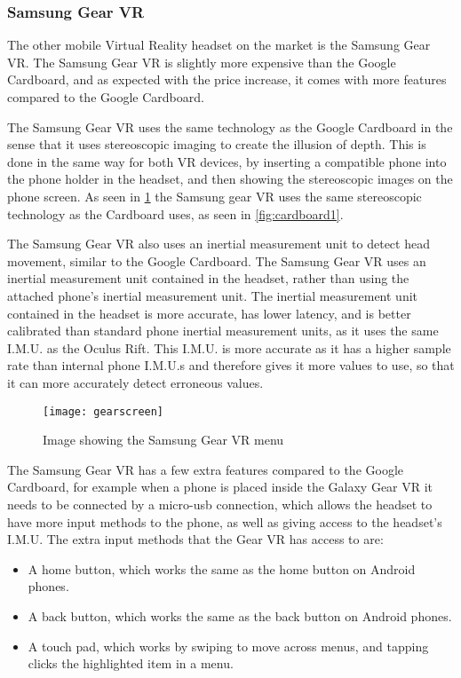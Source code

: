 \subsubsection{Samsung Gear VR}
The other mobile Virtual Reality headset on the market is the Samsung Gear VR. The Samsung Gear VR is slightly more expensive than the Google Cardboard, and as expected with the price increase, it comes with more features compared to the Google Cardboard.
\newline
\par
The Samsung Gear VR uses the same technology as the Google Cardboard in the sense that it uses stereoscopic imaging to create the illusion of depth. This is done in the same way for both VR devices, by inserting a compatible phone into the phone holder in the headset, and then showing the stereoscopic images on the phone screen. As seen in \ref{fig:gearscreen} the Samsung gear VR uses the same stereoscopic technology as the Cardboard uses, as seen in \ref{fig:cardboard1}.
\newline
\par
The Samsung Gear VR also uses an inertial measurement unit to detect head movement, similar to the Google Cardboard. The Samsung Gear VR uses an inertial measurement unit contained in the headset, rather than using the attached phone's inertial measurement unit. The inertial measurement unit contained in the headset is more accurate, has lower latency, and is better calibrated than standard phone inertial measurement units, as it uses the same I.M.U. as the Oculus Rift. This I.M.U. is more accurate as it has a higher sample rate than internal phone I.M.U.s and therefore gives it more values to use, so that it can more accurately detect erroneous values.

\begin{figure}[H]
	\texttt{[image: gearscreen]}
	\centering
	\caption{Image showing the Samsung Gear VR menu \cite{gearmenu}}
	\label{fig:gearscreen}
\end{figure}

The Samsung Gear VR has a few extra features compared to the Google Cardboard, for example when a phone is placed inside the Galaxy Gear VR it needs to be connected by a micro-usb connection, which allows the headset to have more input methods to the phone, as well as giving access to the headset's I.M.U. The extra input methods that the Gear VR has access to are:\\

\begin{itemize}
	\item A home button, which works the same as the home button on Android phones.
	\item A back button, which works the same as the back button on Android phones.
	\item A touch pad, which works by swiping to move across menus, and tapping clicks the highlighted item in a menu.
\end{itemize}


